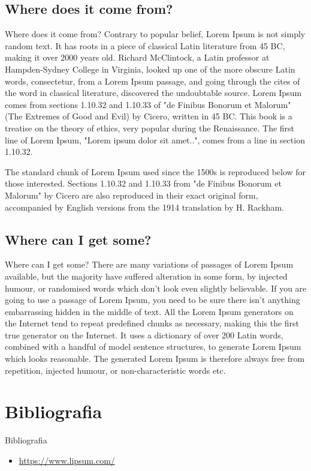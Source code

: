 \documentclass{beamer}
\begin{document}
\subsection{Where does it come from?}
\begin{frame}{Where does it come from?}
	Contrary to popular belief, Lorem Ipsum is not simply random text. It has roots in a piece of classical Latin literature from 45 BC, making it over 2000 years old. Richard McClintock, a Latin professor at Hampden-Sydney College in Virginia, looked up one of the more obscure Latin words, consectetur, from a Lorem Ipsum passage, and going through the cites of the word in classical literature, discovered the undoubtable source. Lorem Ipsum comes from sections 1.10.32 and 1.10.33 of "de Finibus Bonorum et Malorum" (The Extremes of Good and Evil) by Cicero, written in 45 BC. This book is a treatise on the theory of ethics, very popular during the Renaissance. The first line of Lorem Ipsum, "Lorem ipsum dolor sit amet..", comes from a line in section 1.10.32.
	
	The standard chunk of Lorem Ipsum used since the 1500s is reproduced below for those interested. Sections 1.10.32 and 1.10.33 from "de Finibus Bonorum et Malorum" by Cicero are also reproduced in their exact original form, accompanied by English versions from the 1914 translation by H. Rackham.
\end{frame}

\subsection{Where can I get some?}
\begin{frame}{Where can I get some?}
	There are many variations of passages of Lorem Ipsum available, but the majority have suffered alteration in some form, by injected humour, or randomised words which don't look even slightly believable. If you are going to use a passage of Lorem Ipsum, you need to be sure there isn't anything embarrassing hidden in the middle of text. All the Lorem Ipsum generators on the Internet tend to repeat predefined chunks as necessary, making this the first true generator on the Internet. It uses a dictionary of over 200 Latin words, combined with a handful of model sentence structures, to generate Lorem Ipsum which looks reasonable. The generated Lorem Ipsum is therefore always free from repetition, injected humour, or non-characteristic words etc.
\end{frame}

\section{Bibliografia}
\begin{frame}{Bibliografia}
\begin{itemize}
    \item \url{https://www.lipsum.com/}   
\end{itemize}
    
\end{frame}
\end{document}
